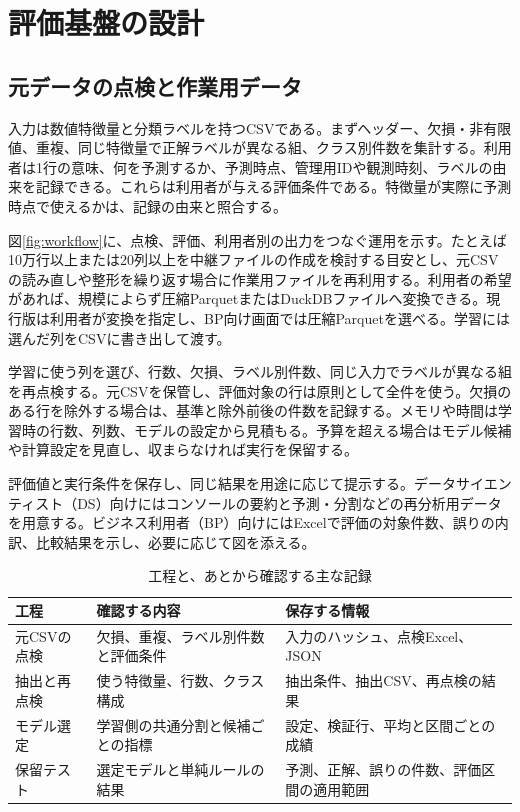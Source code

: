 \section{評価基盤の設計}\label{sec:methods}

\subsection{元データの点検と作業用データ}

入力は数値特徴量と分類ラベルを持つCSVである。まずヘッダー、欠損・非有限値、重複、同じ特徴量で正解ラベルが異なる組、クラス別件数を集計する。利用者は1行の意味、何を予測するか、予測時点、管理用IDや観測時刻、ラベルの由来を記録できる。これらは利用者が与える評価条件である。特徴量が実際に予測時点で使えるかは、記録の由来と照合する。

図\ref{fig:workflow}に、点検、評価、利用者別の出力をつなぐ運用を示す。たとえば10万行以上または20列以上を中継ファイルの作成を検討する目安とし、元CSVの読み直しや整形を繰り返す場合に作業用ファイルを再利用する。利用者の希望があれば、規模によらず圧縮ParquetまたはDuckDBファイルへ変換できる。現行版は利用者が変換を指定し、BP向け画面では圧縮Parquetを選べる。学習には選んだ列をCSVに書き出して渡す\cite{audit}。

学習に使う列を選び、行数、欠損、ラベル別件数、同じ入力でラベルが異なる組を再点検する。元CSVを保管し、評価対象の行は原則として全件を使う。欠損のある行を除外する場合は、基準と除外前後の件数を記録する。メモリや時間は学習時の行数、列数、モデルの設定から見積もる。予算を超える場合はモデル候補や計算設定を見直し、収まらなければ実行を保留する。

評価値と実行条件を保存し、同じ結果を用途に応じて提示する。データサイエンティスト（DS）向けにはコンソールの要約と予測・分割などの再分析用データを用意する。ビジネス利用者（BP）向けにはExcelで評価の対象件数、誤りの内訳、比較結果を示し、必要に応じて図を添える。



\begin{table}[htbp]
\centering
\small
\caption{工程と、あとから確認する主な記録}
\label{tab:pipeline}
\begin{tabularx}{\linewidth}{@{}p{31mm}YY@{}}
\toprule
工程 & 確認する内容 & 保存する情報 \\
\midrule
元CSVの点検 & 欠損、重複、ラベル別件数と評価条件 & 入力のハッシュ、点検Excel、JSON \\
抽出と再点検 & 使う特徴量、行数、クラス構成 & 抽出条件、抽出CSV、再点検の結果 \\
モデル選定 & 学習側の共通分割と候補ごとの指標 & 設定、検証行、平均と区間ごとの成績 \\
保留テスト & 選定モデルと単純ルールの結果 & 予測、正解、誤りの件数、評価区間の適用範囲 \\
\bottomrule
\end{tabularx}
\end{table}

